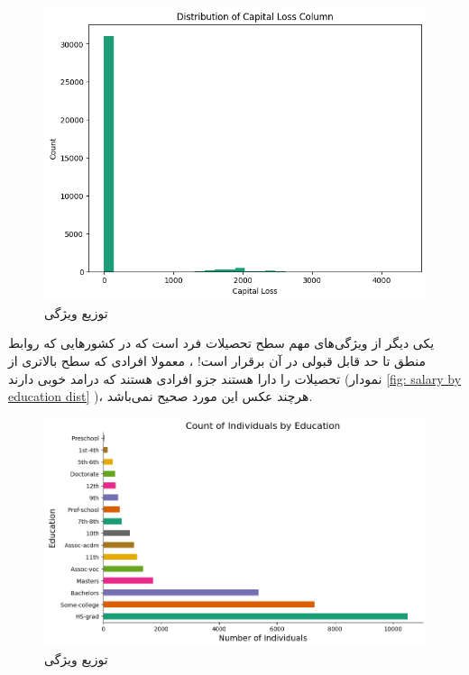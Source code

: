 \documentclass{article}
\begin{document}
	\begin{figure}[H]
		\centering
		\includegraphics[scale=0.5]{figs/capital_loss_dist}
		\caption{
			توزیع ویژگی 
		}
		\label{fig: captial loss}
	\end{figure}
	یکی دیگر از ویژگی‌های مهم سطح تحصیلات فرد است که در کشور‌هایی که روابط منطق تا حد قابل قبولی در آن برقرار است! ، معمولا افرادی که سطح بالاتری از تحصیلات را دارا هستند جزو افرادی هستند که درامد خوبی دارند (نمودار 
	\ref{fig: salary by education dist}
	)،‌ هرچند عکس این مورد صحیح نمی‌باشد.\\
	\begin{figure}[H]
		\centering
		\includegraphics[scale=0.5]{figs/education_dist}
		\caption{
			توزیع ویژگی 
		}
		\label{fig: education dist}
	\end{figure}
\end{document}
